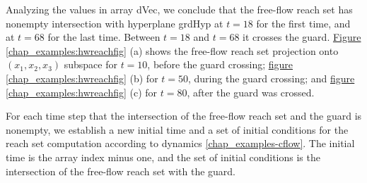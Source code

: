 \documentclass[letterpaper,10pt,english]{sphinxmanual}
\begin{document}
Analyzing the values in array dVec, we conclude that the free-flow reach
set has nonempty intersection with hyperplane grdHyp at $t=18$ for
the first time, and at $t=68$ for the last time. Between
$t=18$ and $t=68$ it crosses the guard. \hyperref[chap_examples:hwreachfig]{Figure  \ref*{chap_examples:hwreachfig}} (a)
shows the free-flow reach set projection onto
$(x_1,x_2,x_3)$ subspace for $t=10$, before the guard
crossing; \hyperref[chap_examples:hwreachfig]{figure  \ref*{chap_examples:hwreachfig}} (b) for $t=50$, during the guard
crossing; and \hyperref[chap_examples:hwreachfig]{figure  \ref*{chap_examples:hwreachfig}} (c) for $t=80$, after the guard
was crossed.

For each time step that the intersection of the free-flow reach set and
the guard is nonempty, we establish a new initial time and a set of
initial conditions for the reach set computation according to dynamics
\eqref{chap_examples-cflow}. The initial time is the array index minus one, and the set of
initial conditions is the intersection of the free-flow reach set with
the guard.
\end{document}
